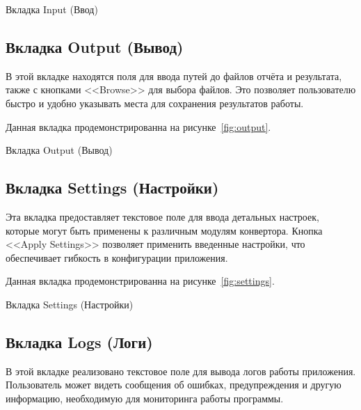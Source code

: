 \begin{image}
	\caption{Вкладка Input (Ввод)}
	\label{fig:input}
\end{image}

\clearpage

\subsection{Вкладка Output (Вывод)}

В этой вкладке находятся поля для ввода путей до файлов отчёта и результата,
также с кнопками <<Browse>> для выбора файлов.
Это позволяет пользователю быстро
и удобно указывать места для сохранения результатов работы.

Данная вкладка продемонстрированна на рисунке~\ref{fig:output}.

\begin{image}
	\caption{Вкладка Output (Вывод)}
	\label{fig:output}
\end{image}

\clearpage

\subsection{Вкладка Settings (Настройки)}

Эта вкладка предоставляет текстовое поле
для ввода детальных настроек,
которые могут быть применены к различным модулям конвертора.
Кнопка <<Apply Settings>> позволяет применить введенные настройки,
что обеспечивает гибкость в конфигурации приложения.

Данная вкладка продемонстрированна на рисунке~\ref{fig:settings}.

\begin{image}
	\caption{Вкладка Settings (Настройки)}
	\label{fig:settings}
\end{image}

\clearpage

\subsection{Вкладка Logs (Логи)}

В этой вкладке реализовано текстовое поле для вывода логов работы приложения.
Пользователь может видеть сообщения об ошибках,
предупреждения и другую информацию,
необходимую для мониторинга работы программы.

